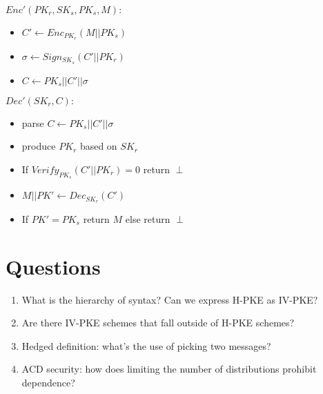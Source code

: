 \documentclass[11pt, pdftex]{article}
\begin{document}
$Enc'(PK_r, SK_s, PK_s, M):$
\begin{itemize}
\item $C' \leftarrow Enc_{PK_r}(M||PK_s)$
\item $\sigma \leftarrow Sign_{SK_s}(C'||PK_r)$
\item $C \leftarrow PK_s||C'||\sigma$\\
\end{itemize}

$Dec'(SK_r, C):$
\begin{itemize}
\item parse $C \leftarrow PK_s||C'||\sigma$
\item produce $PK_r$ based on $SK_r$
\item If $Verify_{PK_s}(C'||PK_r) = 0$ return $\perp$
\item $M||PK' \leftarrow Dec_{SK_r}(C')$
\item If $PK' = PK_s$ return $M$ else return $\perp$
\end{itemize}


\section{Questions}
\begin{enumerate}
\item What is the hierarchy of syntax?  Can we express H-PKE as IV-PKE? 
\item Are there IV-PKE schemes that fall outside of H-PKE schemes?
\item Hedged definition: what's the use of picking two messages?
\item ACD security: how does limiting the number of distributions prohibit dependence?
\end{enumerate}
\end{document}
